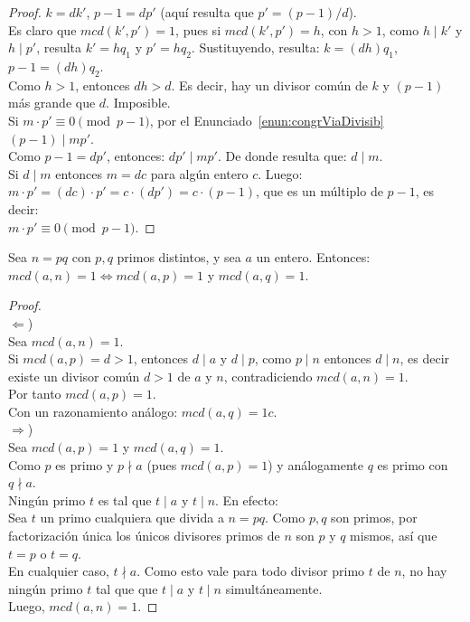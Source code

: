 \begin{proof}
$k=dk'$, $p-1=dp'$ (aquí resulta que $p'=(p-1)/d$). \\
Es claro que $mcd(k',p')=1$, pues si $mcd(k',p')=h$, con $h>1$, como $h \mid k'$ y $h \mid p'$, resulta $k'=hq_1$ y $p'=hq_2$. Sustituyendo, resulta: $k=(dh)q_1$, $p-1=(dh)q_2$. \\
Como $h > 1$, entonces $dh > d$. Es decir, hay un divisor común de $k$ y $(p-1)$ más grande que $d$. Imposible.  \\
Si $m\cdot p' \equiv 0 \pmod {p-1}$, por el Enunciado~\ref{enun:congrViaDivisib} $(p-1) \mid mp'$. \\
Como $p-1 = dp'$, entonces: $dp' \mid mp'$. De donde resulta que: $d \mid m$. \\
Si $d \mid m$ entonces $m = dc$ para algún entero $c$. Luego: \\
$m \cdot p' = (dc) \cdot p' = c \cdot (dp') = c \cdot (p-1)$, que es un múltiplo de $p-1$, es decir: \\
$m \cdot p' \equiv 0 \pmod {p-1}$.
\end{proof}

\begin{enunciado} \label{enun:ncoprimopq}\leavevmode\par 
Sea $n=pq$ con $p,q$ primos distintos, y sea $a$ un entero. Entonces: \\
$mcd(a,n)=1 \iff mcd(a,p)=1$ y $mcd(a,q)=1$.
\end{enunciado}

\begin{proof} \, \\
$\Leftarrow$) \\
Sea $mcd(a,n)=1$. \\
Si $mcd(a,p) = d > 1$, entonces $d \mid a$ y $d \mid p$, como $p \mid n$ entonces $d \mid n$, es decir existe un divisor común $d > 1$ de $a$ y $n$, contradiciendo $mcd(a,n)=1$. \\
Por tanto $mcd(a,p)=1$. \\
Con un razonamiento análogo: $mcd(a,q)=1c$. \\
$\Rightarrow$) \\
Sea $mcd(a,p)=1$ y $mcd(a,q)=1$. \\
Como $p$ es primo y $p\nmid a$ (pues $mcd(a,p)=1$) y análogamente $q$ es primo con $q \nmid a$. \\
Ningún primo $t$ es tal que $t \mid a$ y $t \mid n$. En efecto: \\
Sea $t$ un primo cualquiera que divida a $n=pq$. Como $p,q$ son primos, por factorización única los únicos divisores primos de $n$ son $p$ y $q$ mismos, así que $t=p$ o $t=q$. \\
En cualquier caso, $t \nmid a$. Como esto vale para todo divisor primo $t$ de $n$, no hay ningún primo $t$ tal que que $t \mid a$ y $t \mid n$ simultáneamente. \\ Luego, $mcd(a,n)=1$.
\end{proof}

